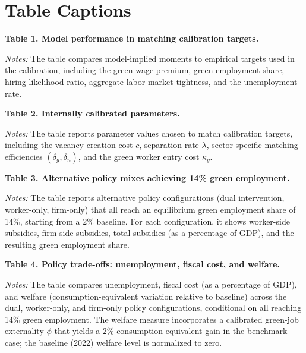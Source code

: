 \documentclass[12pt]{article}
\begin{document}
\bigskip
\bigskip

\section*{Table Captions}

\noindent\textbf{Table 1. Model performance in matching calibration targets.}

\noindent\textit{Notes:} The table compares model-implied moments to empirical targets used in the calibration, including the green wage premium, green employment share, hiring likelihood ratio, aggregate labor market tightness, and the unemployment rate.

\bigskip

\noindent\textbf{Table 2. Internally calibrated parameters.}

\noindent\textit{Notes:} The table reports parameter values chosen to match calibration targets, including the vacancy creation cost $c$, separation rate $\lambda$, sector-specific matching efficiencies $(\delta_g,\delta_n)$, and the green worker entry cost $\kappa_g$.

\bigskip

\noindent\textbf{Table 3. Alternative policy mixes achieving 14\% green employment.}

\noindent\textit{Notes:} The table reports alternative policy configurations (dual intervention, worker-only, firm-only) that all reach an equilibrium green employment share of 14\%, starting from a 2\% baseline. For each configuration, it shows worker-side subsidies, firm-side subsidies, total subsidies (as a percentage of GDP), and the resulting green employment share.

\bigskip

\noindent\textbf{Table 4. Policy trade-offs: unemployment, fiscal cost, and welfare.}

\noindent\textit{Notes:} The table compares unemployment, fiscal cost (as a percentage of GDP), and welfare (consumption-equivalent variation relative to baseline) across the dual, worker-only, and firm-only policy configurations, conditional on all reaching 14\% green employment. The welfare measure incorporates a calibrated green-job externality $\phi$ that yields a 2\% consumption-equivalent gain in the benchmark case; the baseline (2022) welfare level is normalized to zero.
\end{document}
